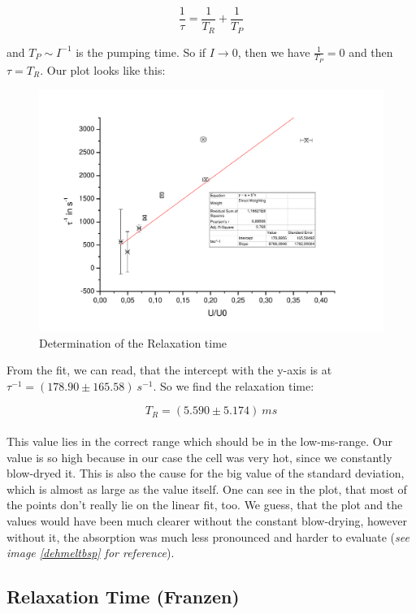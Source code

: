 $$\frac{1}{\tau} = \frac{1}{T_R} + \frac{1}{T_P}$$

and $T_P \sim I^{-1}$ is the pumping time. So if $I \to 0$, then we have $\frac{1}{T_P} = 0$ and then $\tau = T_R$. Our plot looks like this:\\

\begin{figure}[H]
\centering \includegraphics[width=\textwidth]{BilderAusw/Dehmelt.pdf}
\caption{Determination of the Relaxation time}
\end{figure}

From the fit, we can read, that the intercept with the y-axis is at $\tau^{-1} = (178.90 \pm 165.58)\ s^{-1}$. So we find the relaxation time:

$$\boxed{T_R = (5.590 \pm 5.174)\ ms}$$ \\

This value lies in the correct range which should be in the low-ms-range. Our value is so high because in our case the cell was very hot, since we constantly blow-dryed it. This is also the cause for the big value of the standard deviation, which is almost as large as the value itself. One can see in the plot, that most of the points don't really lie on the linear fit, too. We guess, that the plot and the values would have been much clearer without the constant blow-drying, however without it, the absorption was much less pronounced and harder to evaluate (\emph{see image \ref{dehmeltbsp} for reference}).

\subsection{Relaxation Time (Franzen)} %

